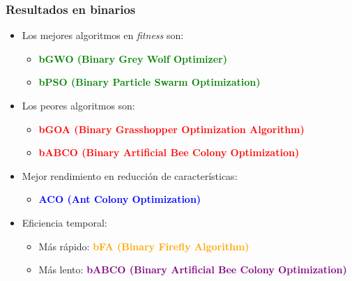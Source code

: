 \begin{frame}
    \frametitle{Resultados en binarios}
    \begin{itemize}
        \item<1-> Los mejores algoritmos en \textit{fitness} son:
            \begin{itemize}
                \item<1-> \textcolor{green}{\textbf{bGWO (Binary Grey Wolf Optimizer)}}
                \item<1-> \textcolor{green}{\textbf{bPSO (Binary Particle Swarm Optimization)}}
            \end{itemize}
        \item<2-> Los peores algoritmos son:
            \begin{itemize}
                \item<2-> \textcolor{red}{\textbf{bGOA (Binary Grasshopper Optimization Algorithm)}}
                \item<2-> \textcolor{red}{\textbf{bABCO (Binary Artificial Bee Colony Optimization)}}
            \end{itemize}
        \item<3-> Mejor rendimiento en reducción de características:
            \begin{itemize}
                \item<3-> \textcolor{blue}{\textbf{ACO (Ant Colony Optimization)}}
            \end{itemize}
        \item<4-> Eficiencia temporal:
            \begin{itemize}
                \item<4-> Más rápido: \textcolor{orange}{\textbf{bFA (Binary Firefly Algorithm)}}
                \item<4-> Más lento: \textcolor{purple}{\textbf{bABCO (Binary Artificial Bee Colony Optimization)}}
            \end{itemize}
    \end{itemize}
\end{frame}

